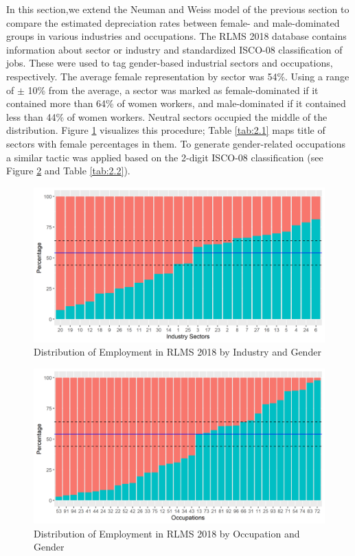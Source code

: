 \documentclass[alpha-refs]{wiley-article-02b}
\begin{document}
In this section,we extend the Neuman and Weiss model of the previous 
section to compare the estimated depreciation rates between female- and 
male-dominated groups in various industries and occupations. The RLMS 2018 
database contains information about sector or industry and standardized 
ISCO-08 classification of jobs. These were used  to tag gender-based 
industrial sectors and occupations, respectively. The average female 
representation by sector was 54\%.  Using a range of $\pm$ 10\% from the 
average, a sector was marked as female-dominated if it contained more than 
64\% of women workers, and male-dominated if it contained less than 44\% of 
women workers. Neutral sectors occupied the middle of the distribution. 
Figure \ref{fig:2.1} visualizes this procedure; Table \ref{tab:2.1} maps 
title of sectors with female percentages in them. To generate 
gender-related occupations a similar tactic was applied based on the 
2-digit ISCO-08 classification (see Figure \ref{fig:2.2} and Table 
\ref{tab:2.2}). 

\begin{figure}[H]
	\centering
	\includegraphics[width=400pt]{gen_ind18.png}
	\caption{Distribution of Employment in RLMS 2018 by Industry and Gender}\label{fig:2.1}
\end{figure}

\begin{figure}[H]
	\centering
	\includegraphics[width=400pt]{gen_occ18.png}
	\caption{Distribution of Employment in RLMS 2018 by Occupation and Gender}\label{fig:2.2}
\end{figure}
	
\end{document}
